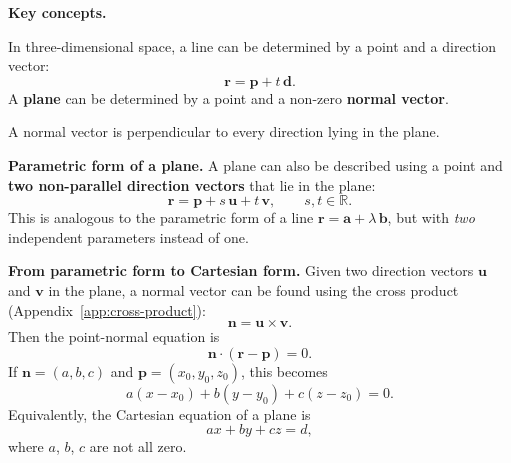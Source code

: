 \begingroup
\small

\noindent{}

\vspace{0.8em}

\noindent\textbf{Key concepts.}

In three-dimensional space, a line can be determined by a point and a
direction vector:
\[
  \mathbf{r} = \mathbf{p} + t\,\mathbf{d}.
\]
A \textbf{plane} can be determined by a point and a non-zero
\textbf{normal vector}.

A normal vector is perpendicular to every direction lying in the
plane.

\vspace{0.4em}
\noindent\textbf{Parametric form of a plane.}
A plane can also be described using a point and \textbf{two
non-parallel direction vectors} that lie in the plane:
\[
  \boxed{
  \mathbf{r} = \mathbf{p} + s\,\mathbf{u} + t\,\mathbf{v}
  },
  \qquad s, t \in \mathbb{R}.
\]
This is analogous to the parametric form of a line
$\mathbf{r} = \mathbf{a} + \lambda\,\mathbf{b}$,
but with \emph{two} independent parameters instead of one.

\vspace{0.4em}
\noindent\textbf{From parametric form to Cartesian form.}
Given two direction vectors $\mathbf{u}$ and $\mathbf{v}$ in the
plane, a normal vector can be found using the cross product
(Appendix~\ref{app:cross-product}):
\[
  \mathbf{n} = \mathbf{u} \times \mathbf{v}.
\]
Then the point-normal equation is
\[
  \boxed{\mathbf{n} \cdot (\mathbf{r} - \mathbf{p}) = 0}.
\]
If $\mathbf{n} = (a, b, c)$ and
$\mathbf{p} = (x_0, y_0, z_0)$, this becomes
\[
  a(x - x_0) + b(y - y_0) + c(z - z_0) = 0.
\]
Equivalently, the Cartesian equation of a plane is
\[
  \boxed{ax + by + cz = d},
\]
where $a$, $b$, $c$ are not all zero.

